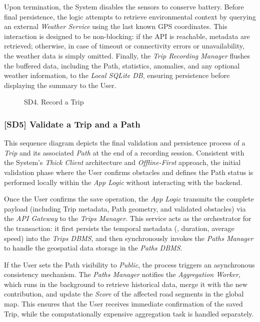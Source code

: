 Upon termination, the System disables the sensors to conserve battery. Before final persistence, the logic attempts to retrieve environmental context by querying an external \emph{Weather Service} using the last known GPS coordinates. This interaction is designed to be non-blocking: if the API is reachable, metadata are retrieved; otherwise, in case of timeout or connectivity errors or unavailability, the weather data is simply omitted. Finally, the \emph{Trip Recording Manager} flushes the buffered data, including the Path, statistics, anomalies, and any optional weather information, to the \emph{Local SQLite DB}, ensuring persistence before displaying the summary to the User.
\begin{figure}[hp]
    \centering
    
    \caption{SD4. Record a Trip}
    \label{fig:SD4}
\end{figure}
\newpage
\subsubsection*{[SD5] Validate a Trip and a Path}
This sequence diagram depicts the final validation and persistence process of a \emph{Trip} and its associated \emph{Path} at the end of a recording session.
Consistent with the System's \emph{Thick Client} architecture and \emph{Offline-First} approach, the initial validation phase where the User confirms obstacles and defines the Path status is performed locally within the \emph{App Logic} without interacting with the backend.

Once the User confirms the save operation, the \emph{App Logic} transmits the complete payload (including Trip metadata, Path geometry, and validated obstacles) via the \emph{API Gateway} to the \emph{Trips Manager}. This service acts as the orchestrator for the transaction: it first persists the temporal metadata (\eg, duration, average speed) into the \emph{Trips DBMS}, and then synchronously invokes the \emph{Paths Manager} to handle the geospatial data storage in the \emph{Paths DBMS}.

If the User sets the Path visibility to \emph{Public}, the process triggers an asynchronous consistency mechanism. The \emph{Paths Manager} notifies the \emph{Aggregation Worker}, which runs in the background to retrieve historical data, merge it with the new contribution, and update the \emph{Score} of the affected road segments in the global map. This ensures that the User receives immediate confirmation of the saved Trip, while the computationally expensive aggregation task is handled separately.

